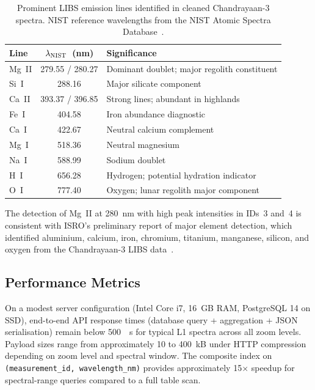 \documentclass[a4paper,twocolumn,10pt]{article}
\begin{document}
\begin{table}[htbp]
\centering
\caption{Prominent LIBS emission lines identified in cleaned
  Chandrayaan-3 spectra.  NIST reference wavelengths from the
  NIST Atomic Spectra Database~\cite{NIST}.}
\label{tab:emission_lines}
\begin{tabularx}{\columnwidth}{l c X}
\toprule
\textbf{Line} & \textbf{$\lambda_{\rm NIST}$~(nm)} &
  \textbf{Significance} \\
\midrule
Mg~II & 279.55 / 280.27 & Dominant doublet; major regolith
  constituent \\
Si~I  & 288.16 & Major silicate component \\
Ca~II & 393.37 / 396.85 & Strong lines; abundant in highlands \\
Fe~I  & 404.58 & Iron abundance diagnostic \\
Ca~I  & 422.67 & Neutral calcium complement \\
Mg~I  & 518.36 & Neutral magnesium \\
Na~I  & 588.99 & Sodium doublet \\
H~I   & 656.28 & Hydrogen; potential hydration indicator \\
O~I   & 777.40 & Oxygen; lunar regolith major component \\
\bottomrule
\end{tabularx}
\end{table}

The detection of Mg~II at 280~nm with high peak intensities in IDs~3
and~4 is consistent with ISRO's preliminary report of major element
detection, which identified aluminium, calcium, iron, chromium,
titanium, manganese, silicon, and oxygen from the Chandrayaan-3 LIBS
data~\cite{ISROCh3}.

\subsection{Performance Metrics}

On a modest server configuration (Intel Core i7, 16~GB RAM,
PostgreSQL 14 on SSD), end-to-end API response times (database query
+ aggregation + JSON serialisation) remain below \SI{500}{\milli
\second} for typical L1 spectra across all zoom levels.
Payload sizes range from approximately 10 to 400~kB under HTTP
compression depending on zoom level and spectral window.  The
composite index on \texttt{(measurement\_id, wavelength\_nm)}
provides approximately 15$\times$ speedup for spectral-range queries
compared to a full table scan.
\end{document}

